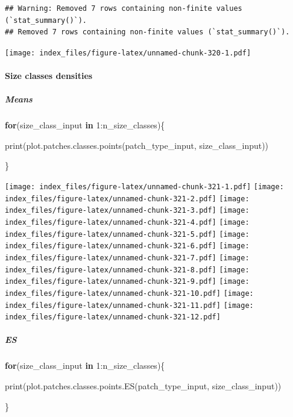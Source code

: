 \documentclass[
]{article}
\newenvironment{Shaded}{\begin{snugshade}}{\end{snugshade}}
\newcommand{\ControlFlowTok}[1]{\textcolor[rgb]{0.13,0.29,0.53}{\textbf{#1}}}
\newcommand{\DecValTok}[1]{\textcolor[rgb]{0.00,0.00,0.81}{#1}}
\newcommand{\FunctionTok}[1]{\textcolor[rgb]{0.00,0.00,0.00}{#1}}
\newcommand{\NormalTok}[1]{#1}
\newcommand{\SpecialCharTok}[1]{\textcolor[rgb]{0.00,0.00,0.00}{#1}}
\begin{document}
\begin{verbatim}
## Warning: Removed 7 rows containing non-finite values (`stat_summary()`).
## Removed 7 rows containing non-finite values (`stat_summary()`).
\end{verbatim}

\texttt{[image: index\_files/figure-latex/unnamed-chunk-320-1.pdf]}

\hypertarget{size-classes-densities-1}{%
\paragraph{Size classes densities}\label{size-classes-densities-1}}

\hypertarget{means-24}{%
\subparagraph{Means}\label{means-24}}

\begin{Shaded}
\begin{Highlighting}[]
\ControlFlowTok{for}\NormalTok{(size\_class\_input }\ControlFlowTok{in} \DecValTok{1}\SpecialCharTok{:}\NormalTok{n\_size\_classes)\{}
  
  \FunctionTok{print}\NormalTok{(}\FunctionTok{plot.patches.classes.points}\NormalTok{(patch\_type\_input,}
\NormalTok{                            size\_class\_input))}
  
\NormalTok{\}}
\end{Highlighting}
\end{Shaded}

\texttt{[image: index\_files/figure-latex/unnamed-chunk-321-1.pdf]}
\texttt{[image: index\_files/figure-latex/unnamed-chunk-321-2.pdf]}
\texttt{[image: index\_files/figure-latex/unnamed-chunk-321-3.pdf]}
\texttt{[image: index\_files/figure-latex/unnamed-chunk-321-4.pdf]}
\texttt{[image: index\_files/figure-latex/unnamed-chunk-321-5.pdf]}
\texttt{[image: index\_files/figure-latex/unnamed-chunk-321-6.pdf]}
\texttt{[image: index\_files/figure-latex/unnamed-chunk-321-7.pdf]}
\texttt{[image: index\_files/figure-latex/unnamed-chunk-321-8.pdf]}
\texttt{[image: index\_files/figure-latex/unnamed-chunk-321-9.pdf]}
\texttt{[image: index\_files/figure-latex/unnamed-chunk-321-10.pdf]}
\texttt{[image: index\_files/figure-latex/unnamed-chunk-321-11.pdf]}
\texttt{[image: index\_files/figure-latex/unnamed-chunk-321-12.pdf]}

\hypertarget{es-6}{%
\subparagraph{ES}\label{es-6}}

\begin{Shaded}
\begin{Highlighting}[]
\ControlFlowTok{for}\NormalTok{(size\_class\_input }\ControlFlowTok{in} \DecValTok{1}\SpecialCharTok{:}\NormalTok{n\_size\_classes)\{}
  
  \FunctionTok{print}\NormalTok{(}\FunctionTok{plot.patches.classes.points.ES}\NormalTok{(patch\_type\_input,}
\NormalTok{                            size\_class\_input))}
  
\NormalTok{\}}
\end{Highlighting}
\end{Shaded}
\end{document}
